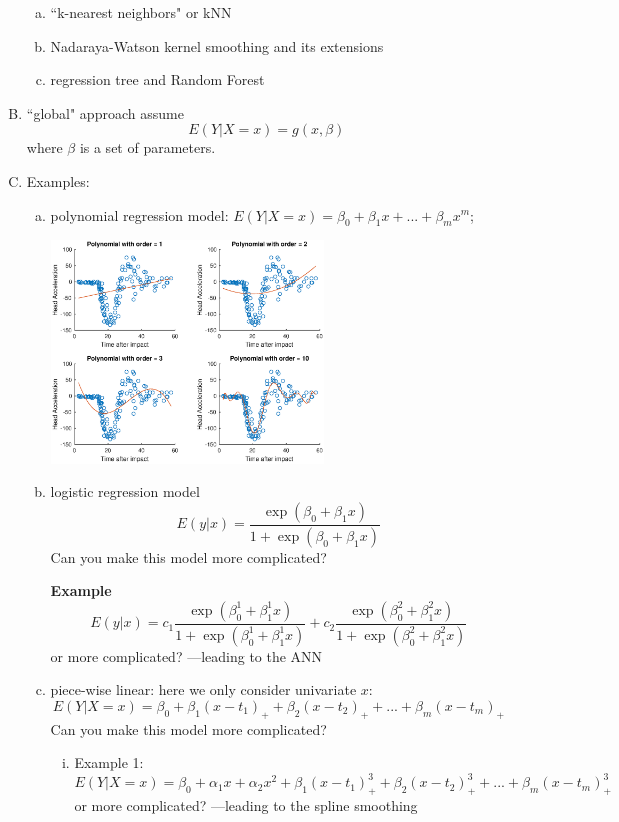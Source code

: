 \documentclass[19pt,landscaoe]{article}
\begin{document}
\begin{enumerate}[(A)]
\begin{enumerate}[(a)]
            \item ``k-nearest neighbors" or kNN
            
            \item Nadaraya-Watson kernel smoothing and its extensions
            
            \item regression tree and Random Forest
            
            \end{enumerate}
            \item ``global" approach assume
$$
E(Y|X=x)  = g(x, \beta)
$$
where $\beta$ is a set of parameters.

\item Examples:

\begin{enumerate}[(a)]

\item polynomial regression model: $ E(Y|X=x) = \beta_0 + \beta_1 x  + ... + \beta_m x^m $;
\begin{center}
\includegraphics[width=0.6\textwidth,height=0.35\textwidth]{polyfitting.eps}
\end{center}
\item logistic regression model
$$
  E(y|x) = \frac{\exp(\beta_0 + \beta_1 x)}{1+\exp(\beta_0 + \beta_1 x)}
$$
Can you make this model more complicated?

\textbf{Example}
$$
  E(y|x) = c_1 \frac{\exp(\beta^{1}_0 + \beta^{1}_1 x)}{1+\exp(\beta^{1}_0 + \beta^{1}_1 x)} + c_2 \frac{\exp(\beta^{2}_0 + \beta^{2}_1 x)}{1+\exp(\beta^{2}_0 + \beta^{2}_1 x)}
$$
 or more complicated?  ---leading to the ANN
\item piece-wise linear: here we only consider univariate $ x $:
$$ E(Y|X=x) = \beta_0 + \beta_1 (x-t_1)_+ + \beta_2 (x-t_2)_+  + ... + \beta_m (x-t_m)_+ $$
Can you make this model more complicated?
\begin{enumerate}[(i)]
    \item Example 1:
    $$ E(Y|X=x) = \beta_0 + \alpha_1 x + \alpha_2 x^2 + \beta_1 (x-t_1)^3_+ + \beta_2 (x-t_2)^3_+  + ... + \beta_m (x-t_m)^3_+ $$
    or more complicated?  ---leading to the spline smoothing
    

\end{enumerate}
\end{enumerate}
\end{enumerate}
\end{document}
